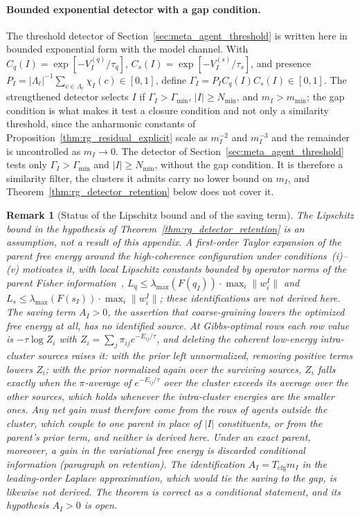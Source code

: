 \documentclass[11pt]{article}
\newtheorem{remark}{Remark}
\begin{document}
\paragraph{Bounded exponential detector with a gap condition.}
The threshold detector of Section~\ref{sec:meta_agent_threshold} is written here in bounded exponential form with the model channel. With $C_q(I) = \exp[-V_I^{(q)}/\tau_q]$, $C_s(I) = \exp[-V_I^{(s)}/\tau_s]$, and presence $P_I = |\Lambda_\ell|^{-1}\sum_{c \in \Lambda_\ell}\chi_I(c) \in [0, 1]$, define $\Gamma_I = P_I C_q(I) C_s(I) \in [0, 1]$. The strengthened detector selects $I$ if $\Gamma_I > \Gamma_{\min}$, $|I| \ge N_{\min}$, and $m_I > m_{\min}$; the gap condition is what makes it test a closure condition and not only a similarity threshold, since the anharmonic constants of Proposition~\ref{thm:rg_residual_explicit} scale as $m_I^{-2}$ and $m_I^{-3}$ and the remainder is uncontrolled as $m_I \to 0$. The detector of Section~\ref{sec:meta_agent_threshold} tests only $\Gamma_I > \Gamma_{\min}$ and $|I| \ge N_{\min}$, without the gap condition. It is therefore a similarity filter, the clusters it admits carry no lower bound on $m_I$, and Theorem~\ref{thm:rg_detector_retention} below does not cover it.

\begin{remark}[Status of the Lipschitz bound and of the saving term]
\label{rem:rg_detector_saving}
The Lipschitz bound in the hypothesis of Theorem~\ref{thm:rg_detector_retention} is an assumption, not a result of this appendix. A first-order Taylor expansion of the parent free energy around the high-coherence configuration under conditions~(i)--(v) motivates it, with local Lipschitz constants bounded by operator norms of the parent Fisher information~\cite{Amari2016}, $L_q \le \lambda_{\max}(F(q_I)) \cdot \max_i\|w_i^I\|$ and $L_s \le \lambda_{\max}(F(s_I)) \cdot \max_i\|w_i^I\|$; these identifications are not derived here. The saving term $A_I>0$, the assertion that coarse-graining lowers the optimized free energy at all, has no identified source. At Gibbs-optimal rows each row value is $-\tau\log Z_i$ with $Z_i=\sum_j\pi_{ij}e^{-E_{ij}/\tau}$, and deleting the coherent low-energy intra-cluster sources raises it: with the prior left unnormalized, removing positive terms lowers $Z_i$; with the prior normalized again over the surviving sources, $Z_i$ falls exactly when the $\pi$-average of $e^{-E_{ij}/\tau}$ over the cluster exceeds its average over the other sources, which holds whenever the intra-cluster energies are the smaller ones. Any net gain must therefore come from the rows of agents outside the cluster, which couple to one parent in place of $|I|$ constituents, or from the parent's prior term, and neither is derived here. Under an exact parent, moreover, a gain in the variational free energy is discarded conditional information (paragraph on retention). The identification $A_I=T_{\mathrm{cfg}}m_I$ in the leading-order Laplace approximation, which would tie the saving to the gap, is likewise not derived. The theorem is correct as a conditional statement, and its hypothesis $A_I>0$ is open.
\end{remark}
\end{document}
